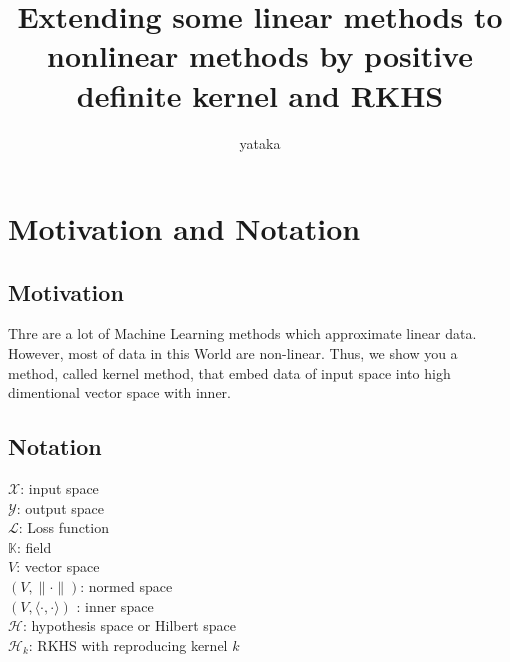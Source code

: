 \documentclass[11pt, a4paper, english, dvipdfmx]{jsarticle}
\title{Extending some linear methods to nonlinear methods by positive definite kernel and RKHS}
\author{yataka}
\date{}
\theoremstyle{definition}
\def\hoge<#1>{\langle #1 \rangle}
\newcommand{\K}{\mathbb{K}}
\newcommand{\X}{\mathcal{X}}
\newcommand{\Y}{\mathcal{Y}}
\newcommand{\Hil}{\mathcal{H}}
\renewcommand{\L}{\mathcal{L}}
\begin{document}
\maketitle
\setcounter{section}{-1}
\section{Motivation and Notation}
\subsection{Motivation}
Thre are a lot of Machine Learning methods which approximate linear data.
However, most of data in this World are non-linear. Thus, we show you a method, called kernel method, that
embed data of input space into high dimentional vector space with inner.
\subsection{Notation}
\noindent
$\X$: input space\\
$\Y$: output space\\
$\L$: Loss function\\
$\K$: field\\
$V$: vector space\\
$(V, \|\cdot\|)$: normed space\\
$(V, \hoge<\cdot, \cdot>)$ : inner space\\
$\Hil$: hypothesis space or Hilbert space\\
$\Hil_{k}$: RKHS with reproducing kernel $k$\\
\end{document}
